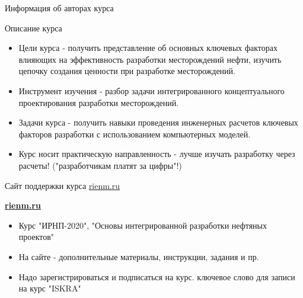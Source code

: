 \begin{frame}{Информация об авторах курса}

    
\end{frame}

\begin{frame}{Описание курса}
\begin{itemize}
    \item Цели курса - получить представление об основных ключевых факторах влияющих на эффективность разработки месторождений нефти, изучить цепочку создания ценности при разработке месторождений.
    \item Инструмент изучения - разбор задачи интегрированного концептуального проектирования разработки месторождений.
    \item Задачи курса - получить навыки проведения инженерных расчетов ключевых факторов разработки с использованием компьютерных моделей.
    \item Курс носит практическую направленность - лучше изучать разработку через расчеты! ("разработчикам платят за цифры"!)
\end{itemize}
\end{frame}

\begin{frame}{Сайт поддержки курса \href{rienm.ru}{rienm.ru}}
\begin{center}
 \textbf{ \href{rienm.ru}{rienm.ru}   }
\end{center}
 
\begin{itemize}
    \item Курс "ИРНП-2020", "Основы интегрированной разработки нефтяных проектов"
    \item На сайте - дополнительные материалы, инструкции, задания и пр.
    \item Надо зарегистрироваться и подписаться на курс. ключевое слово для записи на курс "ISKRA"
\end{itemize}
    
\end{frame}

